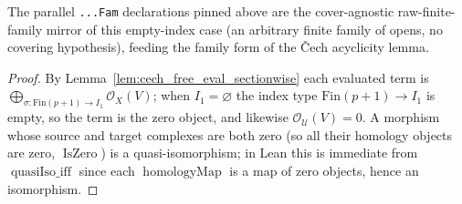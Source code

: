 \begin{lemma}
  The parallel \texttt{...Fam} declarations pinned above are the cover-agnostic
  raw-finite-family mirror of this empty-index case (an arbitrary finite family of
  opens, no covering hypothesis), feeding the family form of the {\v C}ech
  acyclicity lemma.
\end{lemma}

\begin{proof}
  By Lemma~\ref{lem:cech_free_eval_sectionwise} each evaluated term is
  \(\bigoplus_{\sigma : \mathrm{Fin}(p+1) \to I_1} \mathcal{O}_X(V)\); when
  \(I_1 = \varnothing\) the index type \(\mathrm{Fin}(p+1) \to I_1\) is empty, so the
  term is the zero object, and likewise \(\mathcal{O}_{\mathcal{U}}(V) = 0\). A
  morphism whose source and target complexes are both zero (so all their homology
  objects are zero, \(\operatorname{IsZero}\)) is a quasi-isomorphism; in Lean this is
  immediate from \(\operatorname{quasiIso\_iff}\) since each
  \(\operatorname{homologyMap}\) is a map of zero objects, hence an isomorphism.
\end{proof}

